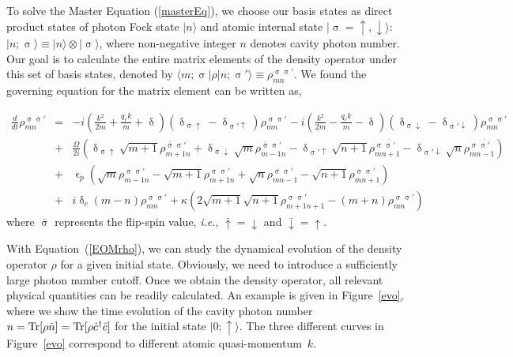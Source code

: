 \documentclass[atoms,article,accept,moreauthors,pdftex,12pt,a4paper]{mdpi}
\def\ba{\begin{eqnarray}}
\def\ea{\end{eqnarray}}
\begin{document}
To solve the Master Equation (\ref{masterEq}), we choose our basis states as direct product states of photon Fock state $|n \rangle$ and atomic internal state $|\upsigma=\uparrow,\downarrow \rangle$: $|n;\upsigma\rangle \equiv |n \rangle \otimes |\upsigma \rangle$, %
where non-negative integer $n$ denotes cavity photon number. Our goal is to calculate the entire matrix elements of the density operator under this set of basis states, denoted by $\langle m;\upsigma|\rho|n;\upsigma'\rangle\equiv\rho_{mn}^{\upsigma\upsigma'}$. We found the governing equation for the matrix element can be written as,


\ba
\frac{d}{dt}\rho_{mn}^{\upsigma\upsigma'}
& = & -i\left(\frac{{k}^{2}}{2m}+\frac{q_{r}k}{m}+ \updelta\right)\left(\updelta_{\upsigma\uparrow}-\updelta_{\upsigma'\uparrow}\right)\rho_{mn}^{\upsigma\upsigma'}
-  i\left(\frac{{k}^{2}}{2m}-\frac{q_{r}k}{m}-\updelta\right)\left(\updelta_{\upsigma\downarrow}-\updelta_{\upsigma'\downarrow}\right)\rho_{mn}^{\upsigma\upsigma'}\nonumber\\
& + & \frac{\Omega}{2i}(\updelta_{\upsigma\uparrow}\sqrt{m+1}\rho_{m+1n}^{\bar{\upsigma}\upsigma'}
+\updelta_{\upsigma\downarrow}\sqrt{m}\rho_{m-1n}^{\bar{\upsigma}\upsigma'}
-\updelta_{\upsigma'\uparrow}\sqrt{n+1}\rho_{mn+1}^{\upsigma\bar{\upsigma'}}
-\updelta_{\upsigma'\downarrow}\sqrt{n}\rho_{mn-1}^{\upsigma\bar{\upsigma'}})\nonumber\\
& + & \upvarepsilon_{p}\left(\sqrt{m}\rho_{m-1n}^{\upsigma\upsigma'}-\sqrt{m+1}\rho_{m+1n}^{\upsigma\upsigma'}+\sqrt{n}\rho_{mn-1}^{\upsigma\upsigma'}-\sqrt{n+1}\rho_{mn+1}^{\upsigma\upsigma'}\right)\nonumber\\
& + & i\updelta_{c}\left(m-n\right)\rho_{mn}^{\upsigma\upsigma'}
+ \kappa\left(2\sqrt{m+1}\sqrt{n+1}\rho_{m+1n+1}^{\upsigma\upsigma'}-(m+n)\rho_{mn}^{\upsigma\upsigma'}\right)\label{EOMrho}
\ea
where $\bar{\upsigma}$ represents the flip-spin value, \emph{i.e.}, $\bar{\uparrow}=\downarrow$ and $\bar{\downarrow}=\uparrow$.

With Equation~(\ref{EOMrho}), we can study the dynamical evolution of the density operator $\rho$ for a given initial state. Obviously, we need to introduce a sufficiently large photon number cutoff. Once we obtain the density operator, all relevant physical quantities can be readily calculated. An example is given in Figure~\ref{evo}, where we show the time evolution of the cavity photon number $n = {\rm Tr}[\rho \hat{n}]= {\rm Tr}[\rho \hat{c}^\dag \hat{c}]$ for the initial state $|0; \uparrow \rangle$. The three different curves in Figure~\ref{evo} correspond to different atomic quasi-momentum~$k$.
\end{document}
